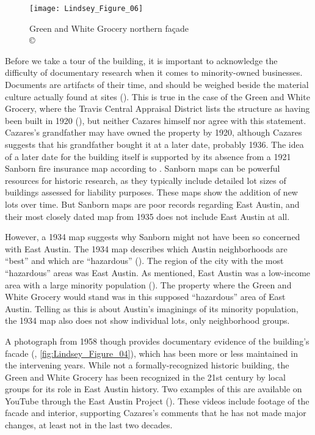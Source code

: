 \begin{figure}[!tb]
	\texttt{[image: Lindsey\_Figure\_06]}
	\caption{Green and White Grocery northern façade\\
		{\normalfont\scriptsize \copyright\
			\shortauthor
	}}
	\label{fig:Lindsey_Figure_06}
\end{figure}



Before we take a tour of the building, it is important to acknowledge the difficulty of documentary research when it comes to minority-owned businesses. Documents are artifacts of their time, and should be weighed beside the material culture actually found at sites (\cite{moreland}). This is true in the case of the Green and White Grocery, where the Travis Central Appraisal District lists the structure as having been built in 1920 (\cite{tcad}), but neither Cazares himself nor \textcite[75-76]{hardy} agree with this statement. Cazares's grandfather may have owned the property by 1920, although Cazares suggests that his grandfather bought it at a later date, probably 1936. The idea of a later date for the building itself is supported by its absence from a 1921 Sanborn fire insurance map according to \textcite[75-76]{hardy}. Sanborn maps can be powerful resources for historic research, as they typically include detailed lot sizes of buildings assessed for liability purposes. These maps show the addition of new lots over time. But Sanborn maps are poor records regarding East Austin, and their most closely dated map from 1935 \parencite{sanborn} does not include East Austin at all.

However, a 1934 map suggests why Sanborn might not have been so concerned with East Austin. The 1934 map describes which Austin neighborhoods are “best” and which are “hazardous” (\cite{miller}). The region of the city with the most “hazardous” areas was East Austin. As mentioned, East Austin was a low-income area with a large minority population (\cite{hernandez}). The property where the Green and White Grocery would stand was in this supposed “hazardous” area of East Austin. Telling as this is about Austin's imaginings of its minority population, the 1934 map also does not show individual lots, only neighborhood groups.


A photograph from 1958 though provides documentary evidence of the building's facade (\cite{anon}, \cref{fig:Lindsey_Figure_04}), which has been more or less maintained in the intervening years. While not a formally-recognized historic building, the Green and White Grocery has been recognized in the 21st century by local groups for its role in East Austin history. Two examples of this are available on YouTube through the East Austin Project (\cites{becker}{lepe}). These videos include footage of the facade and interior, supporting Cazares's comments that he has not made major changes, at least not in the last two decades.

